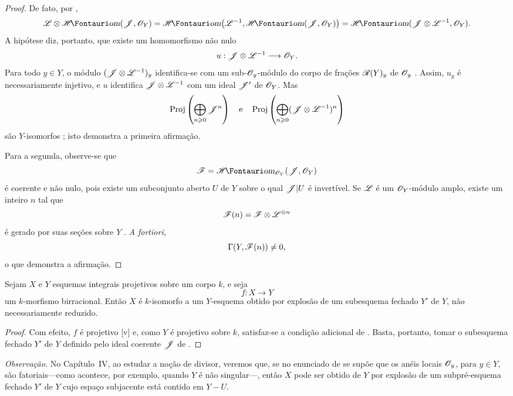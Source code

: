 \begin{proof}
De fato, por ,
\[
  \sh{L}\otimes\shHom(\sh{J},\sh{O}_Y)
  =\shHom\bigl(\sh{L}^{-1},\shHom(\sh{J},\sh{O}_Y)\bigr)
  =\shHom(\sh{J}\otimes\sh{L}^{-1},\sh{O}_Y).
\]
A hipótese diz, portanto, que existe um homomorfismo não nulo
\[
  u:\mathscr{J}\otimes\mathscr{L}^{-1}\longrightarrow\mathscr{O}_Y.
\]
Para todo $y\in Y$, o módulo $(\mathscr{J}\otimes\mathscr{L}^{-1})_y$ identifica-se com um sub-$\mathscr{O}_y$-módulo do corpo de frações $\mathscr{R}(Y)_y$ de $\mathscr{O}_y$ .
Assim, $u_y$ é necessariamente injetivo, e $u$ identifica $\mathscr{J}\otimes\mathscr{L}^{-1}$ com um ideal $\mathscr{J}'$ de $\mathscr{O}_Y$.
Mas
\[
  \operatorname{Proj}\left(\bigoplus_{n\geqslant0}\mathscr{J}^n\right)
  \quad\text{e}\quad
  \operatorname{Proj}\left(\bigoplus_{n\geqslant0}
  (\mathscr{J}\otimes\mathscr{L}^{-1})^n\right)
\]
são $Y$-isomorfos ; isto demonstra a primeira afirmação.

Para a segunda, observe-se que
\[
  \sh{F}=\shHom_{\sh{O}_Y}(\sh{J},\sh{O}_Y)
\]
é coerente e não nulo, pois existe um subconjunto aberto $U$ de $Y$ sobre o qual $\mathscr{J}|U$ é invertível.
Se $\mathscr{L}$ é um $\mathscr{O}_Y$-módulo amplo, existe um inteiro $n$ tal que
\[
  \mathscr{F}(n)=\mathscr{F}\otimes\mathscr{L}^{\otimes n}
\]
é gerado por suas seções sobre $Y$ .
\emph{A fortiori},
\[
  \Gamma(Y,\mathscr{F}(n))\neq0,
\]
o que demonstra a afirmação.
\end{proof}

\begin{corollary}[2.3.7]
\label{III.2.3.7}
Sejam $X$ e $Y$ esquemas integrais projetivos sobre um corpo $k$, e seja
\[
  f:X\longrightarrow Y
\]
um $k$-morfismo birracional.
Então $X$ é $k$-isomorfo a um $Y$-esquema obtido por explosão de um subesquema fechado $Y'$ de $Y$, não necessariamente reduzido.
\end{corollary}

\begin{proof}
Com efeito, $f$ é projetivo [v] e, como $Y$ é projetivo sobre $k$, satisfaz-se a condição adicional de .
Basta, portanto, tomar o subesquema fechado $Y'$ de $Y$ definido pelo ideal coerente $\mathscr{J}$ de .
\end{proof}

\begin{env}[2.3.8]
\label{III.2.3.8}
\emph{Observação.}
No Capítulo~IV, ao estudar a noção de divisor, veremos que, se no enunciado de  se supõe que os anéis locais $\mathscr{O}_y$, para $y\in Y$, são fatoriais---como acontece, por exemplo, quando $Y$ é não singular---, então $X$ pode ser obtido de $Y$ por explosão de um subpré-esquema fechado $Y'$ de $Y$ cujo espaço subjacente está contido em $Y-U$.
\end{env}


